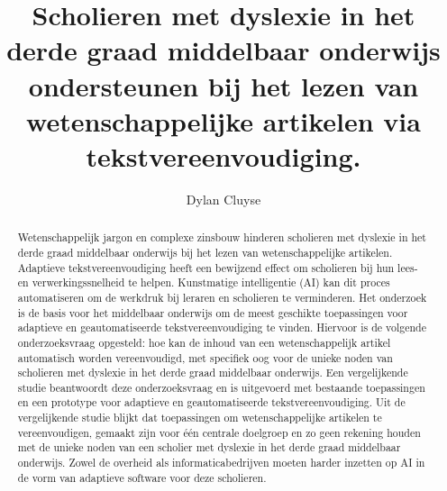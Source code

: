 \documentclass{hogent-article}
\title{Scholieren met dyslexie in het derde graad middelbaar onderwijs ondersteunen bij het lezen van wetenschappelijke artikelen via tekstvereenvoudiging.}
\author{Dylan Cluyse}
\begin{document}
	
\begin{abstract}
Wetenschappelijk jargon en complexe zinsbouw hinderen scholieren met dyslexie in het derde graad middelbaar onderwijs bij het lezen van wetenschappelijke artikelen. Adaptieve tekstvereenvoudiging heeft een bewijzend effect om scholieren bij hun lees- en verwerkingssnelheid te helpen. Kunstmatige intelligentie (AI) kan dit proces automatiseren om de werkdruk bij leraren en scholieren te verminderen. Het onderzoek is de basis voor het middelbaar onderwijs om de meest geschikte toepassingen voor adaptieve en geautomatiseerde tekstvereenvoudiging te vinden.  Hiervoor is de volgende onderzoeksvraag opgesteld: hoe kan de inhoud van een wetenschappelijk artikel automatisch worden vereenvoudigd, met specifiek oog voor de unieke noden van scholieren met dyslexie in het derde graad middelbaar onderwijs. Een vergelijkende studie beantwoordt deze onderzoeksvraag en is uitgevoerd met bestaande toepassingen en een prototype voor adaptieve en geautomatiseerde tekstvereenvoudiging. Uit de vergelijkende studie blijkt dat toepassingen om wetenschappelijke artikelen te vereenvoudigen, gemaakt zijn voor één centrale doelgroep en zo geen rekening houden met de unieke noden van een scholier met dyslexie in het derde graad middelbaar onderwijs. Zowel de overheid als informaticabedrijven moeten harder inzetten op AI in de vorm van adaptieve software voor deze scholieren.
\end{abstract}


\tableofcontents



\printbibliography[heading=bibintoc]
\end{document}

